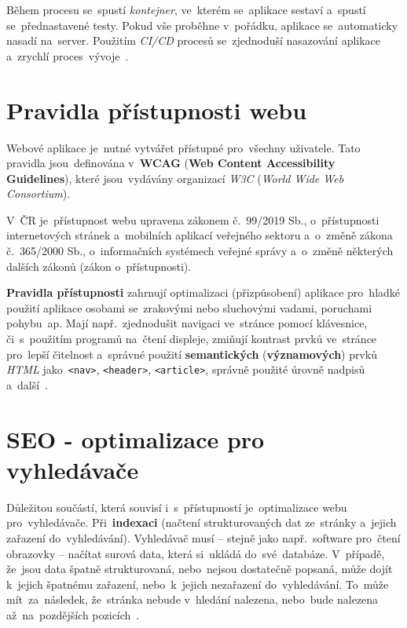 \documentclass[11pt,a4paper]{report}
\begin{document}
                Během procesu se~spustí \emph{kontejner}, ve~kterém se~aplikace sestaví a~spustí se~přednastavené testy. Pokud vše proběhne v~pořádku, aplikace se~automaticky nasadí na~server. Použitím \emph{CI/CD} procesů se~zjednoduší nasazování aplikace a~zrychlí proces~vývoje~\cite{gitlab:actions}.

        \section{Pravidla přístupnosti webu}
                Webové aplikace je~nutné vytvářet přístupné pro~všechny uživatele. Tato pravidla jsou~definována v~\textbf{WCAG} (\textbf{Web Content Accessibility Guidelines}), které jsou~vydávány organizací \emph{W3C} (\emph{World Wide Web Consortium}).

                V~ČR je~přístupnost webu upravena zákonem č.~99/2019 Sb., o~přístupnosti internetových stránek a~mobilních aplikací veřejného sektoru a~o~změně zákona č.~365/2000 Sb., o~informačních systémech veřejné správy a~o~změně některých dalších zákonů (zákon o~přístupnosti).

                \textbf{Pravidla přístupnosti} zahrnují optimalizaci (přizpůsobení) aplikace pro~hladké použití aplikace osobami se~zrakovými nebo sluchovými vadami, poruchami pohybu~ap. Mají např.~zjednodušit navigaci ve~stránce pomocí klávesnice, či~s~použitím programů na~čtení displeje, zmiňují kontrast prvků ve~stránce pro~lepší čitelnost a~správné použití \textbf{semantických} (\textbf{významových}) prvků \emph{HTML} jako~\texttt{<nav>}, \texttt{<header>}, \texttt{<article>}, správně použité úrovně nadpisů a~další~\cite{w3WCAGOverview}.

        \section{SEO - optimalizace pro vyhledávače}
                Důležitou součástí, která souvisí i~s~přístupností je~optimalizace webu pro~vyhledávače. Při~\textbf{indexaci} (načtení strukturovaných dat ze~stránky a~jejich zařazení do~vyhledávání). Vyhledávač musí -- stejně jako např.~software pro~čtení obrazovky -- načítat surová data, která si~ukládá do~své~databáze. V~případě, že~jsou data špatně strukturovaná, nebo~nejsou dostatečně popsaná, může dojít k~jejich špatnému zařazení, nebo~k~jejich nezařazení do~vyhledávání. To~může mít~za~následek, že~stránka nebude v~hledání nalezena, nebo~bude nalezena až~na~pozdějších pozicích~\cite{dover2012seo}.
\end{document}
